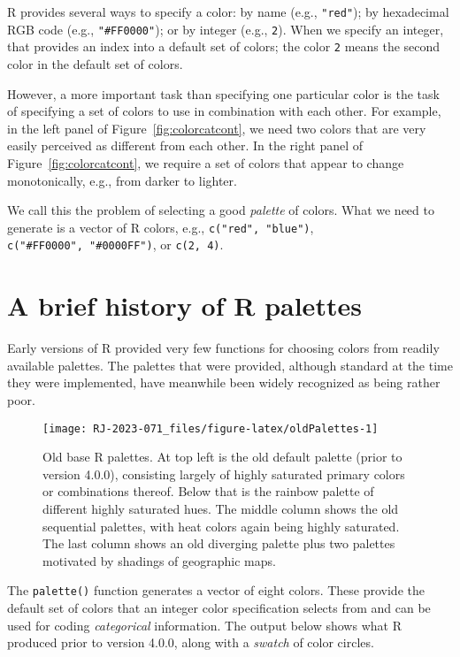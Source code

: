 R provides several ways to specify a color: by name (e.g., \texttt{"red"});
by hexadecimal RGB code (e.g., \texttt{"\#FF0000"}); or by integer (e.g., \texttt{2}).
When we specify an integer, that provides an index into a
default set of colors; the color \texttt{2}
means the second color in the default set of colors.

However, a more important task than specifying one particular color
is the task of specifying a set of colors to use in combination
with each other.
For example, in the left panel of Figure~\ref{fig:colorcatcont},
we need two colors
that are very easily perceived as different from each other.
In the right panel of Figure~\ref{fig:colorcatcont},
we require a set of colors
that appear to change monotonically, e.g., from darker to lighter.

We call this the problem of selecting a good \emph{palette} of colors.
What we need to generate is a vector of R colors, e.g.,
\texttt{c("red",\ "blue")}, \texttt{c("\#FF0000",\ "\#0000FF")}, or \texttt{c(2,\ 4)}.

\hypertarget{a-brief-history-of-r-palettes}{%
\section{A brief history of R palettes}\label{a-brief-history-of-r-palettes}}

Early versions of R provided very few functions for choosing colors from readily available palettes. The palettes
that were provided, although standard at the time they were implemented,
have meanwhile
been widely recognized as being rather poor.

\begin{figure}[ht!]

{\centering \texttt{[image: RJ-2023-071\_files/figure-latex/oldPalettes-1]} 

}

\caption{Old base R palettes.  At top left is the old default palette (prior to version 4.0.0), consisting largely of highly saturated primary colors or combinations thereof.  Below that is the rainbow palette of different highly saturated hues.  The middle column shows the old sequential palettes, with heat colors again being highly saturated.  The last column shows an old diverging palette plus two palettes motivated by shadings of geographic maps.}\label{fig:oldPalettes}
\end{figure}

The \texttt{palette()} function generates a vector of eight colors.
These provide the default set of colors that an integer color specification selects from
and can be used for coding \emph{categorical} information.
The output below shows what R produced prior to version 4.0.0, along with a
\emph{swatch} of color circles.

